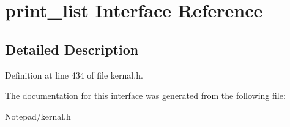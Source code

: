 \section{print\+\_\+list Interface Reference}
\label{interfaceprint__list}


\subsection{Detailed Description}


Definition at line 434 of file kernal.\+h.



The documentation for this interface was generated from the following file\+:\begin{DoxyCompactItemize}
\item 
Notepad/kernal.\+h\end{DoxyCompactItemize}
